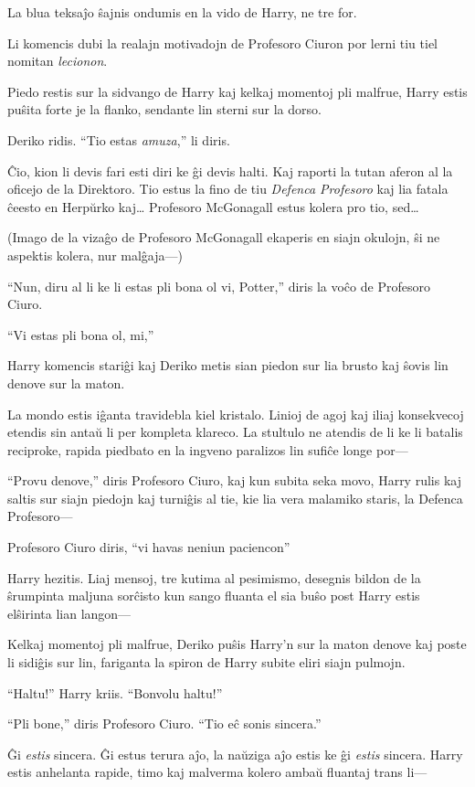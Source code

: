 La blua teksaĵo ŝajnis ondumis en la vido de Harry, ne tre for.

Li komencis dubi la realajn motivadojn de Profesoro Ciuron por lerni
tiu tiel nomitan \emph{lecionon}.

Piedo restis sur la sidvango de Harry kaj kelkaj momentoj pli malfrue, Harry estis puŝita forte je la flanko, sendante lin sterni sur la dorso.

Deriko ridis. ``Tio estas \emph{amuza},'' li diris.

Ĉio, kion li devis fari esti diri ke ĝi devis halti. Kaj raporti la tutan
aferon al la oficejo de la Direktoro. Tio estus la fino de tiu
\emph{Defenca Profesoro} kaj lia fatala ĉeesto en Herpŭrko kaj\ldots
Profesoro McGonagall estus kolera pro tio, sed\ldots

(Imago de la vizaĝo de Profesoro McGonagall ekaperis en siajn okulojn, ŝi ne aspektis kolera, nur malĝaja—)

``Nun, diru al li ke li estas pli bona ol vi, Potter,'' diris la voĉo de Profesoro Ciuro.

``Vi estas pli bona ol, mi,''

Harry komencis stariĝi kaj Deriko metis sian piedon sur lia brusto kaj ŝovis lin denove sur la maton.

La mondo estis iĝanta travidebla kiel kristalo. Linioj de agoj kaj
iliaj konsekvecoj etendis sin antaŭ li per kompleta klareco. La
stultulo ne atendis de li ke li batalis reciproke, rapida piedbato en
la ingveno paralizos lin sufiĉe longe por—

``Provu denove,'' diris Profesoro Ciuro, kaj kun subita seka movo,
Harry rulis kaj saltis sur siajn piedojn kaj turniĝis al tie, kie lia
vera malamiko staris, la Defenca Profesoro—

Profesoro Ciuro diris, ``vi havas neniun paciencon''

Harry hezitis. Liaj mensoj, tre kutima al pesimismo, desegnis bildon
de la ŝrumpinta maljuna sorĉisto kun sango fluanta el sia buŝo post
Harry estis elŝirinta lian langon—

Kelkaj momentoj pli malfrue, Deriko puŝis Harry'n sur la maton denove
kaj poste li sidiĝis sur lin, fariganta la spiron de Harry subite
eliri siajn pulmojn.

``Haltu!'' Harry kriis. ``Bonvolu haltu!''

``Pli bone,'' diris Profesoro Ciuro. ``Tio eĉ sonis sincera.''

Ĝi \emph{estis} sincera. Ĝi estus terura aĵo, la naŭziga aĵo estis ke
ĝi \emph{estis} sincera. Harry estis anhelanta rapide, timo kaj
malverma kolero ambaŭ fluantaj trans li—

